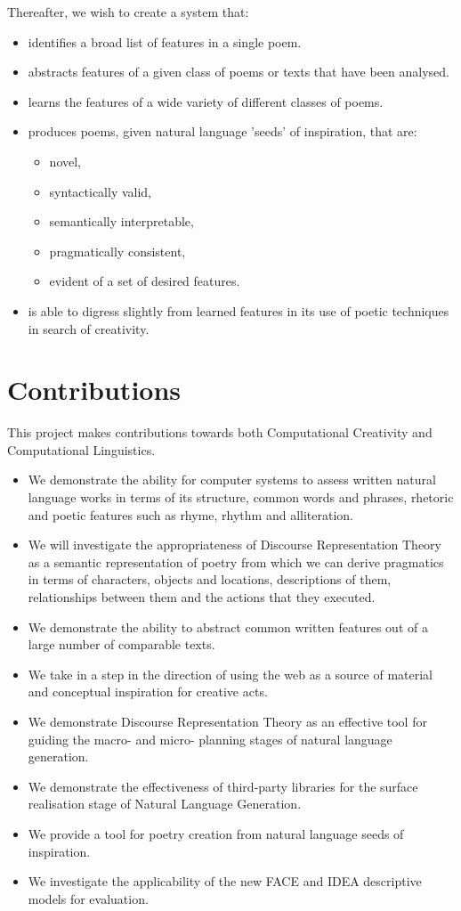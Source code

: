 Thereafter, we wish to create a system that:
\begin{itemize}
\item{identifies a broad list of features in a single poem.} 
\item{abstracts features of a given class of poems or texts that have been analysed.}
\item{learns the features of a wide variety of different classes of poems.}
\item{produces poems, given natural language 'seeds' of inspiration, that are:}
	\begin{itemize}
	\setlength{\itemsep}{0pt}
	\item{novel,}
	\item{syntactically valid,}
	\item{semantically interpretable,}
	\item{pragmatically consistent,}
	\item{evident of a set of desired features.}
	\end{itemize} 
\item{is able to digress slightly from learned features in its use of poetic techniques in search of creativity.}
\end{itemize}


\section{Contributions}
This project makes contributions towards both Computational Creativity and Computational Linguistics.
\begin{itemize}
\item{We demonstrate the ability for computer systems to assess written natural language works in terms of its structure, common words and phrases, rhetoric and poetic features such as rhyme, rhythm and alliteration.}
\item{We will investigate the appropriateness of Discourse Representation Theory as a semantic representation of poetry from which we can derive pragmatics in terms of characters, objects and locations, descriptions of them, relationships between them and the actions that they executed.}
\item {We demonstrate the ability to abstract common written features out of a large number of comparable texts.}
\item{We take in a step in the direction of using the web as a source of material and conceptual inspiration for creative acts.}
\item{We demonstrate Discourse Representation Theory as an effective tool for guiding the macro- and micro- planning stages of natural language generation.}
\item{We demonstrate the effectiveness of third-party libraries for the surface realisation stage of Natural Language Generation.}
\item{We provide a tool for poetry creation from natural language seeds of inspiration.}
\item{We investigate the applicability of the new FACE and IDEA descriptive models for evaluation.}
\end{itemize}



